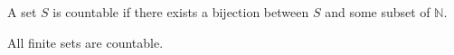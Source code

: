 \documentclass{article}
\begin{document}
A set $S$ is countable if there exists a bijection between $S$ and some subset of $\mathbb{N}$.

All finite sets are countable.
\end{document}
